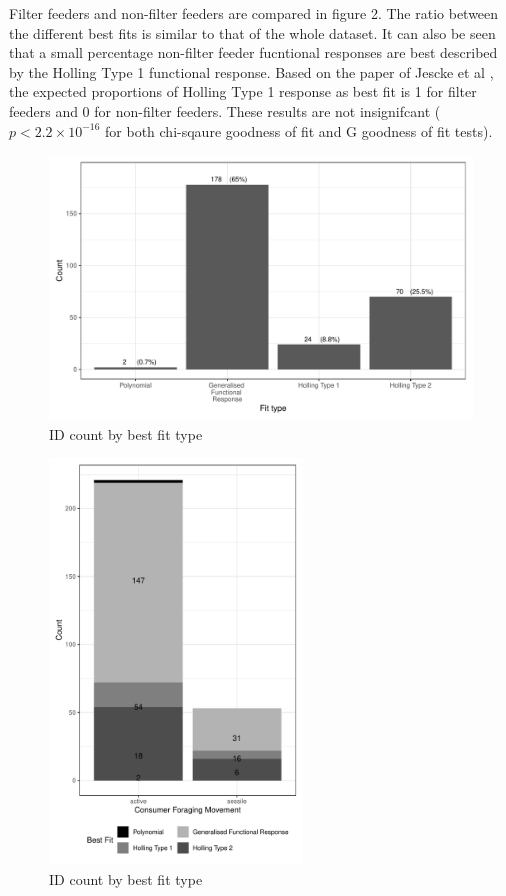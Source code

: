 \documentclass[11pt, a4paper, titlepage]{article}
\begin{document}
Filter feeders and non-filter feeders are compared in figure 2. The ratio between the different best fits is similar to that of the whole dataset. It can also be seen that a small percentage non-filter feeder fucntional responses are best described by the Holling Type 1 functional response. Based on the paper of Jescke et al \parencite{Jeschke2004}, the expected proportions of Holling Type 1 response as best fit is 1 for filter feeders and 0 for non-filter feeders. These results are not insignifcant ($p < 2.2\times10^{-16}$ for both chi-sqaure goodness of fit and G goodness of fit tests). 

\begin{figure}[h!]
	\centering\includegraphics[width=1\textwidth]{../Results/Model_Comparison_Barchart.pdf}
	\caption{ID count by best fit type}
\end{figure}

\begin{figure}[h!]
	\centering\includegraphics[width=0.6\textwidth]{../Results/ConForaging_Comparison_Barchart.pdf}
	\caption{ID count by best fit type}
\end{figure}
\end{document}
